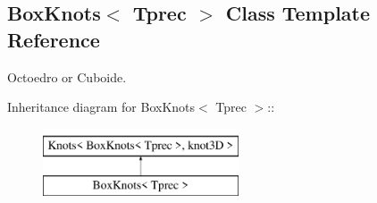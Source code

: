 \hypertarget{classBoxKnots}{
\subsection{BoxKnots$<$ Tprec $>$ Class Template Reference}
\label{classBoxKnots}
}
Octoedro or Cuboide.  


Inheritance diagram for BoxKnots$<$ Tprec $>$::\begin{figure}[H]
\begin{center}
\leavevmode
\includegraphics[height=2cm]{classBoxKnots}
\end{center}
\end{figure}
